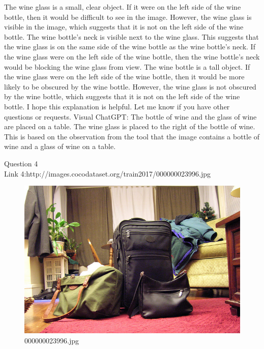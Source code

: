 \begin{enumerate}
        The wine glass is a small, clear object. If it were on the left side of the wine bottle, then it would be difficult to see in the image. However, the wine glass is visible in the image, which suggests that it is not on the left side of the wine bottle.
        The wine bottle's neck is visible next to the wine glass. This suggests that the wine glass is on the same side of the wine bottle as the wine bottle's neck. If the wine glass were on the left side of the wine bottle, then the wine bottle's neck would be blocking the wine glass from view.
        The wine bottle is a tall object. If the wine glass were on the left side of the wine bottle, then it would be more likely to be obscured by the wine bottle. However, the wine glass is not obscured by the wine bottle, which suggests that it is not on the left side of the wine bottle.
        I hope this explanation is helpful. Let me know if you have other questions or requests.
        \subitem Visual ChatGPT: The bottle of wine and the glass of wine are placed on a table. The wine glass is placed to the right of the bottle of wine. This is based on the observation from the tool that the image contains a bottle of wine and a glass of wine on a table.
    \end{enumerate}
Question 4\\
Link 4:http://images.cocodataset.org/train2017/000000023996.jpg
    \begin{figure}[h]
        \centering
        \includegraphics[width=0.8\linewidth]{../image set/easy/000000023996.jpg}
        \caption{000000023996.jpg}
    \end{figure}
